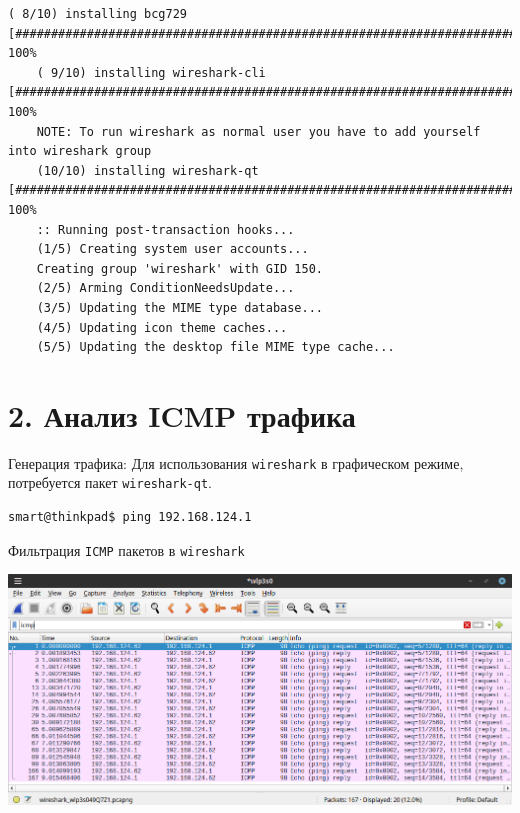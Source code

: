 \begin{Verbatim}[frame=single,breaklines=true,breakanywhere=true]
    ( 8/10) installing bcg729                                                                                                                      [########################################################################################] 100%
    ( 9/10) installing wireshark-cli                                                                                                               [########################################################################################] 100%
    NOTE: To run wireshark as normal user you have to add yourself into wireshark group
    (10/10) installing wireshark-qt                                                                                                                [########################################################################################] 100%
    :: Running post-transaction hooks...
    (1/5) Creating system user accounts...
    Creating group 'wireshark' with GID 150.
    (2/5) Arming ConditionNeedsUpdate...
    (3/5) Updating the MIME type database...
    (4/5) Updating icon theme caches...
    (5/5) Updating the desktop file MIME type cache...
\end{Verbatim}

\section*{2. Анализ ICMP трафика}

Генерация трафика:
Для использования \texttt{wireshark} в графическом режиме, потребуется пакет \texttt{wireshark-qt}.
\begin{Verbatim}[frame=single,breaklines=true,breakanywhere=true]
    smart@thinkpad$ ping 192.168.124.1
\end{Verbatim}

Фильтрация \texttt{ICMP} пакетов в \texttt{wireshark}
\begin{center}
    \includegraphics[scale=0.6]{res/5.wireshark-icmp.png}
\end{center}

